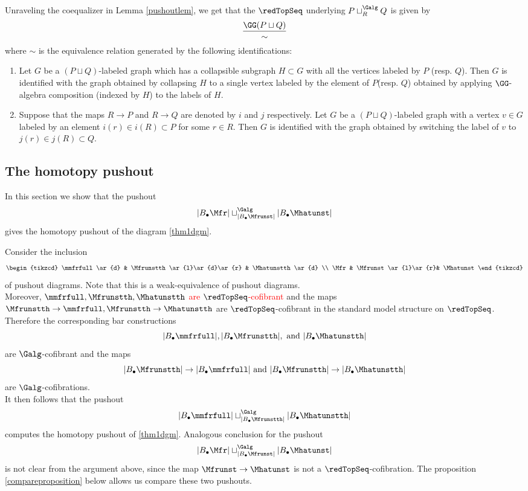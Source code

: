 \documentclass[a4paper,10pt]{amsart}
\begin{document}
Unraveling the coequalizer in Lemma \ref{pushoutlem}, we get that the $\redTopSeq$ underlying $P \sqcup_{R}^{\Galg} Q$ is given by 
\[ \frac{\GG(P \sqcup Q)}{\sim} \]
where $\sim$ is the equivalence relation generated by the following identifications:
\begin{enumerate}
	\item Let $G$ be a $(P \sqcup Q)$-labeled graph which has a collapsible subgraph $H \subset G$ with all the vertices labeled by $P$ (resp. $Q$). Then $G$ is identified with the graph obtained by collapsing $H$ to a single vertex labeled by the element of $P$(resp. $Q$) obtained by applying $\GG$-algebra composition (indexed by $H$) to the labels of $H$. 
	\item Suppose that the maps $R\to P$ and $R \to Q$ are denoted by $i$ and $j$ respectively. Let $G$ be a $(P \sqcup Q)$-labeled graph with a vertex $v \in G$ labeled by an element $i(r) \in i(R) \subset P$ for some $r \in R$. Then $G$ is identified with the graph obtained by switching the label of $v$ to $j(r) \in j(R) \subset Q$.
\end{enumerate}

\subsection{The homotopy pushout}
In this section we show that the pushout 
\[|B_\bullet \Mfr| \sqcup^{\Galg}_{|B_\bullet \Mfrunst|} |B_\bullet \Mhatunst|\] gives the homotopy pushout of the diagram \eqref{thm1dgm}.

Consider the inclusion 
\begin{equation}\label{inclusionofdiagrams} 
	\begin{tikzcd}
	\mmfrfull \ar{d} & \Mfrunstth\ar{l}\ar{d}\ar{r} & \Mhatunstth \ar{d} \\ 
	\Mfr & \Mfrunst \ar{l}\ar{r}& \Mhatunst
	\end{tikzcd}
\end{equation} 
of pushout diagrams. Note that this is a weak-equivalence of pushout diagrams.\\
 Moreover, $\mmfrfull,\Mfrunstth, \Mhatunstth$ \textcolor{red}{are $\redTopSeq$-cofibrant} and the maps $\Mfrunstth \to \mmfrfull, \Mfrunstth \to \Mhatunstth$ are $\redTopSeq$-cofibrant in the standard model structure on $\redTopSeq$.
Therefore the corresponding bar constructions 
\[|B_\bullet \mmfrfull|,|B_\bullet \Mfrunstth|, \mbox{ and } |B_\bullet \Mhatunstth|\]
 are $\Galg$-cofibrant and the maps 
 \[|B_\bullet \Mfrunstth| \to |B_\bullet \mmfrfull| \mbox{ and } |B_\bullet \Mfrunstth| \to |B_\bullet \Mhatunstth|\]
  are $\Galg$-cofibrations.\\ 
It then follows that the pushout
\[|B_\bullet \mmfrfull| \sqcup^{\Galg}_{|B_\bullet \Mfrunstth|} |B_\bullet \Mhatunstth|\]
computes the homotopy pushout of \eqref{thm1dgm}. Analogous conclusion for the pushout 
\[ |B_\bullet \Mfr| \sqcup^{\Galg}_{|B_\bullet \Mfrunst|} |B_\bullet \Mhatunst|\]
 is not clear from the argument above, since the map $\Mfrunst \to \Mhatunst$ is not a $\redTopSeq$-cofibration. The proposition \ref{compareproposition} below allows us compare these two pushouts.
\end{document}
